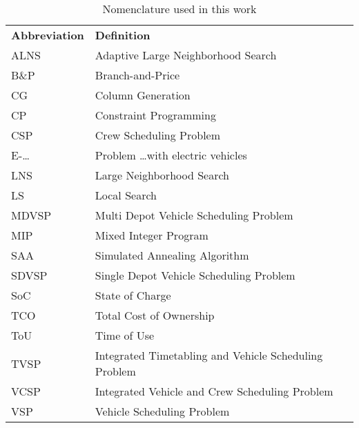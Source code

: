 \documentclass[]{article}
\begin{document}
\begin{table}
  \centering
  \begin{tabular}{ll}
    \toprule
    \multicolumn{1}{l}{\textbf{Abbreviation}} & \multicolumn{1}{l}{\textbf{Definition}}               \\
    \cmidrule(lr){1-1}\cmidrule(lr){2-2}
    ALNS                                      & Adaptive Large Neighborhood Search                    \\
    B\&P                                      & Branch-and-Price                                      \\
    CG                                        & Column Generation                                     \\
    CP                                        & Constraint Programming                                \\
    CSP                                       & Crew Scheduling Problem                               \\
    E-\dots                                   & Problem \dots with electric vehicles                  \\
    LNS                                       & Large Neighborhood Search                             \\
    LS                                        & Local Search                                          \\
    MDVSP                                     & Multi Depot Vehicle Scheduling Problem                \\
    MIP                                       & Mixed Integer Program                                 \\
    SAA                                       & Simulated Annealing Algorithm                         \\
    SDVSP                                     & Single Depot Vehicle Scheduling Problem               \\
    SoC                                       & State of Charge                                       \\
    TCO                                       & Total Cost of Ownership                               \\
    ToU                                       & Time of Use                                           \\
    TVSP                                      & Integrated Timetabling and Vehicle Scheduling Problem \\
    VCSP                                      & Integrated Vehicle and Crew Scheduling Problem        \\
    VSP                                       & Vehicle Scheduling Problem                            \\
    \bottomrule
  \end{tabular}
  \label{tab:nomenclature}
  \caption{Nomenclature used in this work}
\end{table}
\end{document}
